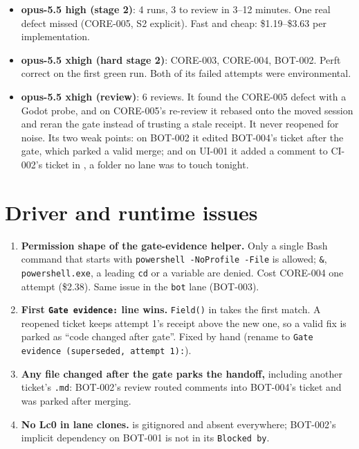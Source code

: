 \documentclass[11pt,a4paper]{article}
\begin{document}
\begin{itemize}
  \item \textbf{opus-5.5 high (stage 2)}: 4 runs, 3 to review in 3--12 minutes. One real
        defect missed (CORE-005, S2 explicit). Fast and cheap: \$1.19--\$3.63 per
        implementation.
  \item \textbf{opus-5.5 xhigh (hard stage 2)}: CORE-003, CORE-004, BOT-002. Perft correct on
        the first green run. Both of its failed attempts were environmental.
  \item \textbf{opus-5.5 xhigh (review)}: 6 reviews. It found the CORE-005 defect with a
        Godot probe, and on CORE-005's re-review it rebased onto the moved session and reran
        the gate instead of trusting a stale receipt. It never reopened for noise. Its two
        weak points: on BOT-002 it edited BOT-004's ticket after the gate, which parked a
        valid merge; and on UI-001 it added a comment to CI-002's ticket in
        , a folder no lane was to touch tonight.
\end{itemize}

\section*{Driver and runtime issues}

\begin{enumerate}
  \item \textbf{Permission shape of the gate-evidence helper.} Only a single Bash command
        that starts with \texttt{powershell -NoProfile -File} is allowed; \texttt{\&},
        \texttt{powershell.exe}, a leading \texttt{cd} or a variable are denied. Cost
        CORE-004 one attempt (\$2.38). Same issue in the \texttt{bot} lane (BOT-003).
  \item \textbf{First \texttt{Gate evidence:} line wins.} \texttt{Field()} in
         takes the first match. A reopened ticket keeps attempt 1's receipt
        above the new one, so a valid fix is parked as ``code changed after gate''. Fixed by
        hand (rename to \texttt{Gate evidence (superseded, attempt 1):}).
  \item \textbf{Any file changed after the gate parks the handoff,} including another ticket's
        \texttt{.md}: BOT-002's review routed comments into BOT-004's ticket and was parked
        after merging.
  \item \textbf{No Lc0 in lane clones.}  is gitignored and absent everywhere;
        BOT-002's implicit dependency on BOT-001 is not in its \texttt{Blocked by}.
\end{enumerate}
\end{document}
